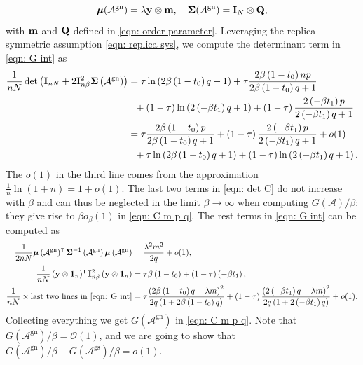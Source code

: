 \documentclass[9pt,twocolumn]{pnas-new}
\begin{document}
\begin{equation}\label{ean: mu sigma gn}
    {\boldsymbol{\mu}}(\mathcal{A}^{\text{gn}})=\lambda \mathbf{y}\otimes \mathbf{m}, \quad {\boldsymbol{\Sigma}}(\mathcal{A}^{\text{gn}})=\mathbf{I}_{N}\otimes \mathbf{Q},
\end{equation}
with $\mathbf{m}$ and $\mathbf{Q}$ defined in \eqref{eqn: order parameter}. Leveraging the replica symmetric assumption \eqref{eqn: replica sys}, we compute the determinant term in \eqref{eqn: G int} as
\begin{equation}\label{eqn: det C}
\begin{aligned}
    \frac{1}{nN}\det\left(\mI_{nN}+2\mI_{n\beta}^{2}{\boldsymbol{\Sigma}}\left(\mathcal{A}^{\text{gn}}\right)\right) &= \tau  \ln\left(2\beta\left(1-t_{0}\right)q+1\right)+\tau  \frac{2\beta\left(1-t_{0}\right) n p}{2\beta\left(1-t_{0}\right)q+1}\\
    &\ \ +\left(1-\tau\right) \ln\left(2\left(-\beta t_{1}\right)q+1\right)+\left(1-\tau\right) \frac{2\left(-\beta t_{1}\right)p}{2\left(-\beta t_{1}\right)q+1}\\
    &=\tau  \frac{2\beta\left(1-t_{0}\right)p}{2\beta\left(1-t_{0}\right)q+1}+\left(1-\tau\right) \frac{2\left(-\beta t_{1}\right)p}{2\left(-\beta t_{1}\right)q+1}+o(1)\\
    &\ \ +\tau  \ln\left(2\beta\left(1-t_{0}\right)q+1\right)+\left(1-\tau\right) \ln\left(2\left(-\beta t_{1}\right)q+1\right).
\end{aligned}
\end{equation}
The $o(1)$ in the third line comes from the approximation $\frac{1}{n}\ln(1+n)= 1+o(1)$. The last two terms in \eqref{eqn: det C} do not increase with $\beta$ and can thus be neglected in the limit $\beta \to \infty$ when computing $G(\mathcal{A})/\beta$: they give rise to $\beta o_\beta(1)$ in \eqref{eqn: C m p q}.  The rest terms in \eqref{eqn: G int} can be computed as 
\begin{equation*}
\begin{aligned}
    \frac{1}{2nN}\boldsymbol{\mu}\left(\mathcal{A}^{\text{gn}}\right)^{\intercal}\boldsymbol{\Sigma}^{-1}\left(\mathcal{A}^{\text{gn}}\right)\boldsymbol{\mu}\left(\mathcal{A}^{\text{gn}}\right)&=\frac{\lambda^{2} m^{2}}{2q}+o(1),\\
    \frac{1}{nN}\left(\vy\otimes \bm{1}_n\right)^{\intercal}\mI_{ n \beta}^{2}\left(\vy\otimes \bm{1}_n\right) &=\tau\beta\left(1-t_{0}\right)+\left(1-\tau\right)\left(-\beta t_{1}\right),\\
    \frac{1}{nN}\times\text{last two lines in \eqref{eqn: G int}}&=\tau\frac{\left(2\beta\left(1-t_{0}\right)q+\lambda m\right)^{2}}{2q\left(1+2\beta\left(1-t_{0}\right)q\right)}+\left(1-\tau\right)\frac{\left(2\left(-\beta t_{1}\right)q+\lambda m\right)^{2}}{2q\left(1+2\left(-\beta t_{1}\right)q\right)}+o(1).
\end{aligned}
\end{equation*}
Collecting everything we get $G(\mathcal{A}^{\text{gn}})$ in \eqref{eqn: C m p q}. Note that $G(\mathcal{A}^{\text{gn}})/\beta=\mathcal{O}(1)$, and we are going to show that $G(\mathcal{A}^{\text{gn}})/\beta-G(\mathcal{A}^{\text{gs}})/\beta=o(1)$.
\end{document}
